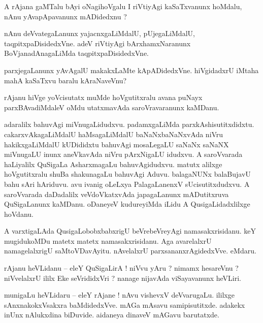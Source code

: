 \documentclass{article}
\begin{document}
\begin{mn}%
A rAjana gaMTalu bAyi oNagihoVgalu I riVtiyAgi kaSaTxvanunx hoMdalu, nAnu yAvapApavanunx mADidedxnu ?
\end{mn}

\begin{mn}%
nAnu deVvategaLanunx yajacnxgaLiMdalU, pUjegaLiMdalU, taqpitxpaDisidedxVne. adeV riVtiyAgi 
bArxhamxNaranunx BoVjanadAnagaLiMda taqpitxpaDisidedxVne.
\end{mn}

\begin{mn}%
parxjegaLanunx yAvAgalU makakxLaMte kApADidedxVne. hiVgidadxrU iMtaha mahA kaSaTxvu baralu 
kAraNaveVnu?
\end{mn}

\begin{mn}%
rAjanu hiVge yoVcisutatx muMde hoVgutitxralu avana puNayx parxBAvadiMdaleV oMdu utatxmavAda 
saroVravaranunx kaMDanu.
\end{mn}

\begin{mn}%
adaralilx bahuvAgi miVnugaLidudxvu. padamxgaLiMda parxkAshisutitxdidxtu. cakarxvAkagaLiMdalU 
haMsagaLiMdalU baNaNxbaNaNxvAda niVru hakikxgaLiMdalU kUDididxtu bahuvAgi mosaLegaLU saNaNx saNaNX 
miVnugaLU inunx aneVkavAda niVru pArxNigaLU idudxvu. A saroVvarada haLiyalilx QuSigaLa 
AsharxmagaLu bahuvAgidudxvu. matutx alilxge hoVgutitxralu shuBa shakunagaLu bahuvAgi Aduvu. 
balagaNUNx balaBujavU bahu sAri hAriduvu. avu ivanig oLeLxya PalagaLanenxV sUcisutitxdudxvu. A 
saroVvarada daDadalilx veVdoVkatxvAda japagaLanunx mADutitxruva QuSigaLanunx kaMDanu. oDaneyeV 
kudureyiMda iLidu A QusigaLidadxlilxge hoVdanu.
\end{mn}

\begin{mn}%
A varxtigaLAda QusigaLobobxbabxrigU beVrebeVreyAgi namasakxrisidanu. keY mugidukoMDu matetx matetx 
namasakxrisidanu. Aga avarelalxrU namagelalxrigU saMtoVDavAyitu. nAvelalxrU parxsananxrAgidedxVve. 
eMdaru.
\end{mn}

\begin{mn}%
rAjanu heVLidanu -- eleY QuSigaLirA ! niVvu yAru ? nimamx hesareVnu ? niVvelalxrU ililx Eke 
seVrididxVri ? nanage nijavAda viSayavanunx heVLiri.
\end{mn}

\begin{mn}%
munigaLu heVLidaru -- eleY rAjane ! nAvu vishevxV deVvarugaLu. ililxge sAnxnakokxVsakxra 
baMdidedxVve. mAGa mAsavu samipisutitxde. adakekx inUnx nAlukxdina biDuvide. aidaneya dinaveV 
mAGavu barutatxde.
\end{mn}
\end{document}
